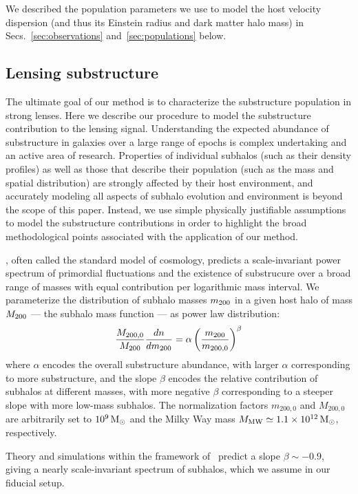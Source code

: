 \documentclass[twocolumn]{aastex62}
\begin{document}
We described the population parameters we use to model the host velocity dispersion (and thus its Einstein radius and dark matter halo mass) in Secs.~\ref{sec:observations} and~\ref{sec:populations} below.

\subsection{Lensing substructure}

The ultimate goal of our method is to characterize the substructure population in strong lenses. Here we describe our procedure to model the substructure contribution to the lensing signal. Understanding the expected abundance of substructure in galaxies over a large range of epochs is complex undertaking and an active area of research. Properties of individual subhalos (such as their density profiles) as well as those that describe their population (such as the mass and spatial distribution) are strongly affected by their host environment, and accurately modeling all aspects of subhalo evolution and environment is beyond the scope of this paper. Instead, we use simple physically justifiable assumptions to model the substructure contributions in order to highlight the broad methodological points associated with the application of our method.

 \lcdm, often called the standard model of cosmology, predicts a scale-invariant power spectrum of primordial fluctuations and the existence of substrucure over a broad range of masses with equal contribution per logarithmic mass interval. We parameterize the distribution of subhalo masses $m_{200}$ in a given host halo of mass $M_{200}$ --- the subhalo mass function --- as power law distribution:
\begin{equation}
\frac{M_{200,0}}{\Mtwo}\frac{dn}{d\mtwo} = \alpha\left(\frac{\mtwo}{m_{200, 0}}\right)^{\beta}
\label{eq:shmf}
\end{equation}
where $\alpha$ encodes the overall substructure abundance, with larger $\alpha$ corresponding to more substructure, and the slope $\beta$ encodes the relative contribution of subhalos at different masses, with more negative $\beta$ corresponding to a steeper slope with more low-mass subhalos. The normalization factors $m_{200, 0}$ and $M_{200, 0}$ are arbitrarily set to $10^9\,\textrm{M}_\odot$ and the Milky Way mass $M_\textrm{MW} \simeq 1.1\times10^{12}\,\textrm{M}_\odot$, respectively.

Theory and simulations within the framework of \lcdm~predict a slope $\beta\sim-0.9$, giving a nearly scale-invariant spectrum of subhalos, which we assume in our fiducial setup.
\end{document}
